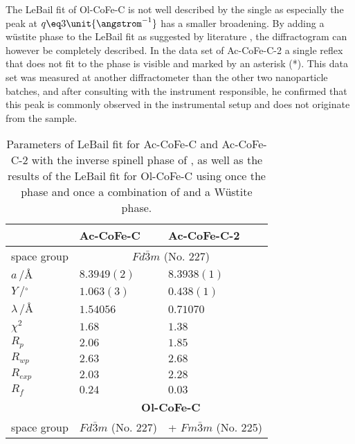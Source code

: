 \documentclass[\main/dresen_thesis.tex]{subfiles}
\begin{document}
  The LeBail fit of Ol-CoFe-C is not well described by the single  as especially the peak at $q \eq 3 \unit{\angstrom^{-1}}$ has a smaller broadening.
  By adding a w\"ustite phase to the LeBail fit as suggested by literature \cite{Bodnarchuk_2009_Excha}, the diffractogram can however be completely described.
  In the data set of Ac-CoFe-C-2 a single reflex that does not fit to the phase is visible and marked by an asterisk (*).
  This data set was measured at another diffractometer than the other two nanoparticle batches, and after consulting with the instrument responsible, he confirmed that this peak is commonly observed in the instrumental setup and does not originate from the sample.
  \begin{table}[ht]
    \centering
    \caption{\label{tab:monolayers:nanoparticle:discussion:xrdLeBail}Parameters of LeBail fit for Ac-CoFe-C and Ac-CoFe-C-2 with the inverse spinell phase of , as well as the results of the LeBail fit for Ol-CoFe-C using once the  phase and once a combination of  and a W\"ustite phase.}
    \begin{tabular}{ l | l | l }
      \hline
      \rule{0pt}{2ex} & \textbf{Ac-CoFe-C} & \textbf{Ac-CoFe-C-2} \\
      \hline
      \rule{0pt}{2ex}space group & \multicolumn{2}{c}{$Fd\bar{3}m$ (No. 227)}\\
      \hline
      \rule{0pt}{2ex} $a \,/ \unit{\angstrom}$        & $8.3949(2)$ & $8.3938(1)$\\
      \rule{0pt}{2ex} $Y \,/ \unit{^\circ}$           & $1.063(3)$  & $0.438(1)$ \\
      \hline
      \rule{0pt}{2ex} $\lambda \,/ \unit{\angstrom}$  & $1.54056$   & $0.71070$ \\
      \hline
      \rule{0pt}{2ex} $\chi^2$  & $1.68$ & $1.38$ \\
      \rule{0pt}{2ex} $R_p$     & $2.06$ & $1.85$ \\
      \rule{0pt}{2ex} $R_{wp}$  & $2.63$ & $2.68$ \\
      \rule{0pt}{2ex} $R_{exp}$ & $2.03$ & $2.28$ \\
      \rule{0pt}{2ex} $R_{f}$   & $0.24$ & $0.03$ \\
      \hline
      \hline
      \rule{0pt}{2ex} & \multicolumn{2}{c}{\textbf{Ol-CoFe-C}}\\
      \hline
      \hline
      \rule{0pt}{2ex}space group & $Fd\bar{3}m$ (No. 227) & + $Fm\bar{3}m$ (No. 225)\\
      \hline

\end{tabular}
\end{table}
\end{document}
